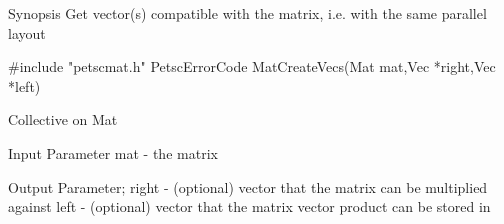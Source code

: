Synopsis
Get vector(s) compatible with the matrix, i.e. with the same parallel layout

#include "petscmat.h" 
PetscErrorCode MatCreateVecs(Mat mat,Vec *right,Vec *left)

Collective on Mat

Input Parameter
mat - the matrix

Output Parameter;
right 	- (optional) vector that the matrix can be multiplied against
left 	- (optional) vector that the matrix vector product can be stored in
